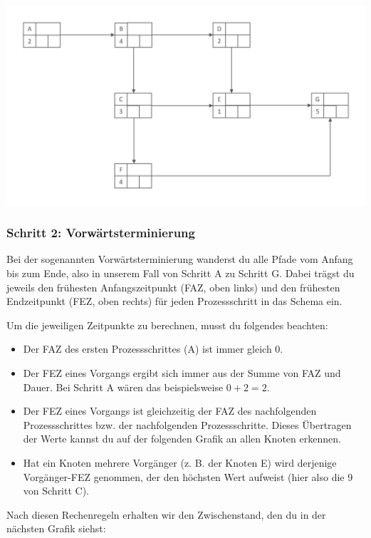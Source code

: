 \begin{center}
	\includegraphics[width=\textwidth]{Bilder/Netzplan/Netzplan1.png}
\end{center}

\subsubsection{Schritt 2: Vorwärtsterminierung}

Bei der sogenannten Vorwärtsterminierung wanderst du alle Pfade vom Anfang bis zum Ende, also in unserem Fall von Schritt A zu Schritt G. Dabei trägst du jeweils den frühesten Anfangszeitpunkt (FAZ, oben links) und den frühesten Endzeitpunkt (FEZ, oben rechts) für jeden Prozessschritt in das Schema ein.

Um die jeweiligen Zeitpunkte zu berechnen, musst du folgendes beachten:

\begin{itemize}
	\item Der FAZ des ersten Prozessschrittes (A) ist immer gleich 0.
	\item Der FEZ eines Vorgangs ergibt sich immer aus der Summe von FAZ und Dauer. Bei Schritt A wären das beispielsweise $0 + 2 = 2$.
	\item Der FEZ eines Vorgangs ist gleichzeitig der FAZ des nachfolgenden Prozessschrittes bzw. der nachfolgenden Prozessschritte. Dieses Übertragen der Werte kannst du auf der folgenden Grafik an allen Knoten erkennen.
	\item Hat ein Knoten mehrere Vorgänger (z. B. der Knoten E) wird derjenige Vorgänger-FEZ genommen, der den höchsten Wert aufweist (hier also die 9 von Schritt C).
\end{itemize}

Nach diesen Rechenregeln erhalten wir den Zwischenstand, den du in der nächsten Grafik siehst:

